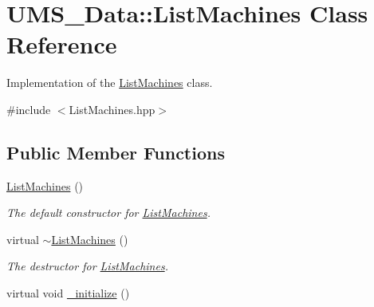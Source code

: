 \hypertarget{classUMS__Data_1_1ListMachines}{
\section{UMS\_\-Data::ListMachines Class Reference}
\label{classUMS__Data_1_1ListMachines}
}


Implementation of the \hyperlink{classUMS__Data_1_1ListMachines}{ListMachines} class.  




{\ttfamily \#include $<$ListMachines.hpp$>$}

\subsection*{Public Member Functions}
\begin{DoxyCompactItemize}
\item 
\hypertarget{classUMS__Data_1_1ListMachines_a77bc32ac07244ec3aa089ae33ef62ae4}{
\hyperlink{classUMS__Data_1_1ListMachines_a77bc32ac07244ec3aa089ae33ef62ae4}{ListMachines} ()}
\label{classUMS__Data_1_1ListMachines_a77bc32ac07244ec3aa089ae33ef62ae4}

\begin{DoxyCompactList}\small\item\em The default constructor for \hyperlink{classUMS__Data_1_1ListMachines}{ListMachines}. \item\end{DoxyCompactList}\item 
\hypertarget{classUMS__Data_1_1ListMachines_a438f4f9f84e06756c6d8475cfe99d11e}{
virtual \hyperlink{classUMS__Data_1_1ListMachines_a438f4f9f84e06756c6d8475cfe99d11e}{$\sim$ListMachines} ()}
\label{classUMS__Data_1_1ListMachines_a438f4f9f84e06756c6d8475cfe99d11e}

\begin{DoxyCompactList}\small\item\em The destructor for \hyperlink{classUMS__Data_1_1ListMachines}{ListMachines}. \item\end{DoxyCompactList}\item 
\hypertarget{classUMS__Data_1_1ListMachines_a012f70d2520ab25c531b14d42febe7da}{
virtual void \hyperlink{classUMS__Data_1_1ListMachines_a012f70d2520ab25c531b14d42febe7da}{\_\-initialize} ()}
\label{classUMS__Data_1_1ListMachines_a012f70d2520ab25c531b14d42febe7da}


\end{DoxyCompactItemize}
